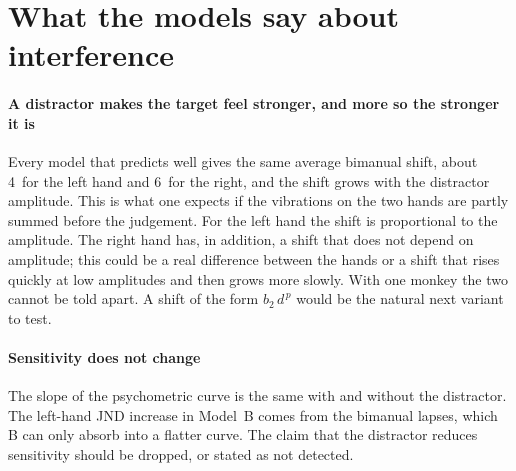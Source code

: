 \section{What the models say about interference}\label{sec:interp}

\paragraph{A distractor makes the target feel stronger, and more so the stronger it is}
Every model that predicts well gives the same average bimanual shift, about 4\um\ for the left hand and 6\um\ for the right, and the shift grows with the distractor amplitude.
This is what one expects if the vibrations on the two hands are partly summed before the judgement.
For the left hand the shift is proportional to the amplitude.
The right hand has, in addition, a shift that does not depend on amplitude; this could be a real difference between the hands or a shift that rises quickly at low amplitudes and then grows more slowly. With one monkey the two cannot be told apart. A shift of the form $b_2\,d^{\,p}$ would be the natural next variant to test.

\paragraph{Sensitivity does not change}
The slope of the psychometric curve is the same with and without the distractor.
The left-hand JND increase in Model~B comes from the bimanual lapses, which B can only absorb into a flatter curve.
The claim that the distractor reduces sensitivity should be dropped, or stated as not detected.

